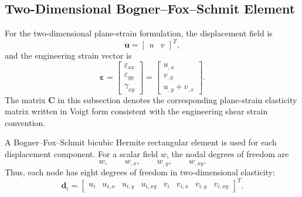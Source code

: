 \documentclass[final,3p,times,fleqn]{elsarticle}
\begin{document}
\subsection{Two-Dimensional Bogner--Fox--Schmit Element}
\label{subsec:two_dimensional_bfs_element}

For the two-dimensional plane-strain formulation, the displacement field
is
\begin{equation}
\label{eq:2d_displacement}
\mathbf{u}
=
\begin{bmatrix}
u & v
\end{bmatrix}^{T},
\end{equation}
and the engineering strain vector is
\begin{equation}
\label{eq:2d_fem_strain_vector}
\boldsymbol{\varepsilon}
=
\begin{bmatrix}
\varepsilon_{xx} \\
\varepsilon_{yy} \\
\gamma_{xy}
\end{bmatrix}
=
\begin{bmatrix}
u_{,x} \\
v_{,y} \\
u_{,y}+v_{,x}
\end{bmatrix}.
\end{equation}
The matrix $\mathbf{C}$ in this subsection denotes the corresponding
plane-strain elasticity matrix written in Voigt form consistent with the
engineering shear strain convention.

A Bogner--Fox--Schmit bicubic Hermite rectangular element is used for
each displacement component. For a scalar field $w$, the nodal degrees of
freedom are
\begin{equation}
\label{eq:2d_scalar_bfs_dofs}
w,
\qquad
w_{,x},
\qquad
w_{,y},
\qquad
w_{,xy}.
\end{equation}
Thus, each node has eight degrees of freedom in two-dimensional
elasticity:
\begin{equation}
\label{eq:2d_bfs_dofs_fem}
\mathbf{d}_i
=
\begin{bmatrix}
u_i & u_{i,x} & u_{i,y} & u_{i,xy} &
v_i & v_{i,x} & v_{i,y} & v_{i,xy}
\end{bmatrix}^{T}.
\end{equation}
\end{document}

